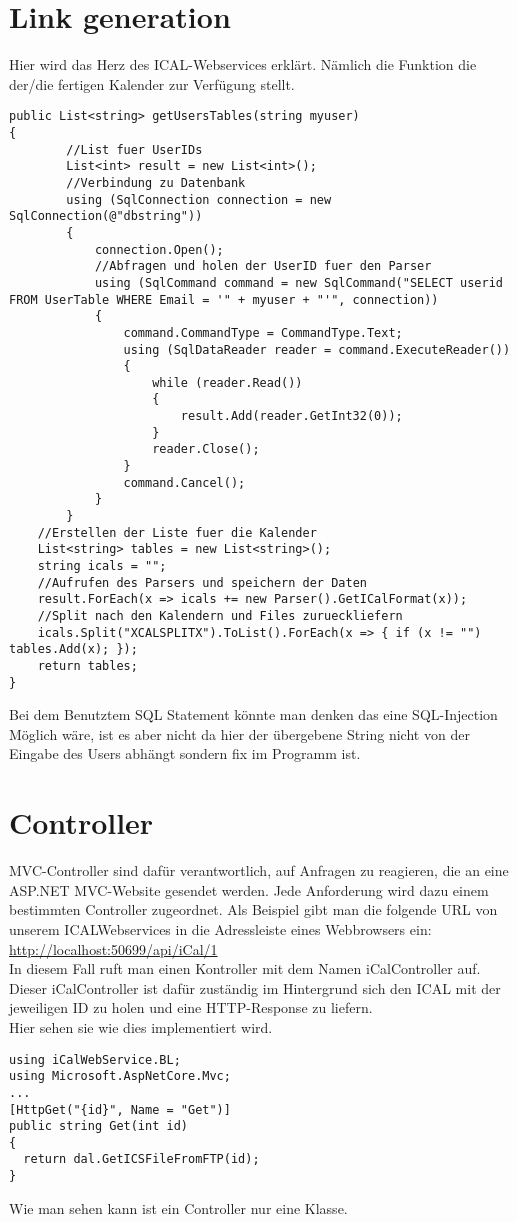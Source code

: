 {\section{Link generation}
\label{sec:link}
Hier wird das Herz des ICAL-Webservices erklärt. Nämlich die Funktion die der/die fertigen Kalender zur Verfügung stellt.
\begin{lstlisting}
public List<string> getUsersTables(string myuser)
{
        //List fuer UserIDs
        List<int> result = new List<int>();
        //Verbindung zu Datenbank
        using (SqlConnection connection = new SqlConnection(@"dbstring"))
        {
            connection.Open();
            //Abfragen und holen der UserID fuer den Parser
            using (SqlCommand command = new SqlCommand("SELECT userid FROM UserTable WHERE Email = '" + myuser + "'", connection))
            {
                command.CommandType = CommandType.Text;
                using (SqlDataReader reader = command.ExecuteReader())
                {
                    while (reader.Read())
                    {
                        result.Add(reader.GetInt32(0));
                    }
                    reader.Close();
                }
                command.Cancel();
            }
        }
    //Erstellen der Liste fuer die Kalender
    List<string> tables = new List<string>();
    string icals = "";
    //Aufrufen des Parsers und speichern der Daten
    result.ForEach(x => icals += new Parser().GetICalFormat(x));
    //Split nach den Kalendern und Files zurueckliefern
    icals.Split("XCALSPLITX").ToList().ForEach(x => { if (x != "") tables.Add(x); });
    return tables;
}
\end{lstlisting}
Bei dem Benutztem SQL Statement könnte man denken das eine SQL-Injection Möglich wäre, ist es aber nicht da hier der übergebene String nicht von der Eingabe des Users abhängt sondern fix im Programm ist.
\section{Controller}
\label{sec:Controller}
MVC-Controller sind dafür verantwortlich, auf Anfragen zu reagieren, die an eine ASP.NET MVC-Website gesendet werden. Jede Anforderung wird dazu einem bestimmten Controller zugeordnet. Als Beispiel gibt man die folgende URL von unserem ICALWebservices in die Adressleiste eines Webbrowsers ein:\\
\url{http://localhost:50699/api/iCal/1} \\
In diesem Fall ruft man einen Kontroller mit dem Namen iCalController auf. Dieser iCalController ist dafür zuständig im Hintergrund sich den ICAL mit der jeweiligen ID zu holen und eine HTTP-Response zu liefern.\\ Hier sehen sie wie dies implementiert wird.
\begin{lstlisting}
using iCalWebService.BL;
using Microsoft.AspNetCore.Mvc;
...
[HttpGet("{id}", Name = "Get")]
public string Get(int id)
{
  return dal.GetICSFileFromFTP(id);
}
\end{lstlisting}
Wie man sehen kann ist ein Controller nur eine Klasse.
}
